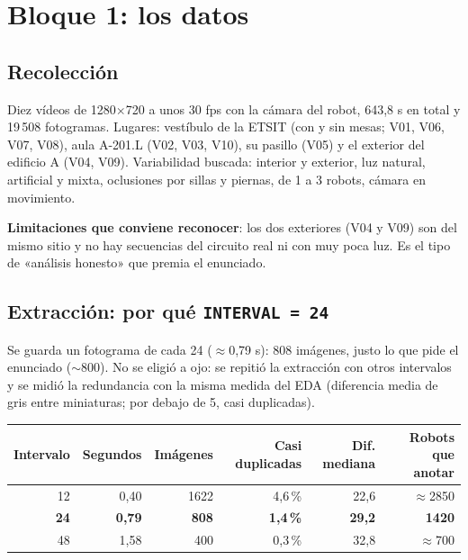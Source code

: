 \documentclass[11pt,a4paper]{article}
\begin{document}
\newpage
\section{Bloque 1: los datos}\label{sec:bloque1}

\subsection{Recolección}
Diez vídeos de 1280$\times$720 a unos 30 fps con la cámara del robot, 643,8 s en total y 19\,508 fotogramas. Lugares: vestíbulo de la ETSIT (con y sin mesas; V01, V06, V07, V08), aula A-201.L (V02, V03, V10), su pasillo (V05) y el exterior del edificio A (V04, V09). Variabilidad buscada: interior y exterior, luz natural, artificial y mixta, oclusiones por sillas y piernas, de 1 a 3 robots, cámara en movimiento.

\textbf{Limitaciones que conviene reconocer}: los dos exteriores (V04 y V09) son del mismo sitio y no hay secuencias del circuito real ni con muy poca luz. Es el tipo de «análisis honesto» que premia el enunciado.

\subsection{Extracción: por qué \texttt{INTERVAL = 24}}
Se guarda un fotograma de cada 24 ($\approx$0,79 s): 808 imágenes, justo lo que pide el enunciado ($\sim$800). No se eligió a ojo: se repitió la extracción con otros intervalos y se midió la redundancia con la misma medida del EDA (diferencia media de gris entre miniaturas; por debajo de 5, casi duplicadas).

\begin{center}
\small
\begin{tabular}{@{}rrrrrr@{}}
\toprule
\textbf{Intervalo} & \textbf{Segundos} & \textbf{Imágenes} & \textbf{Casi duplicadas} & \textbf{Dif. mediana} & \textbf{Robots que anotar} \\
\midrule
12 & 0,40 & 1622 & 4,6\,\% & 22,6 & $\approx$2850 \\
\textbf{24} & \textbf{0,79} & \textbf{808} & \textbf{1,4\,\%} & \textbf{29,2} & \textbf{1420} \\
48 & 1,58 & 400 & 0,3\,\% & 32,8 & $\approx$700 \\
\bottomrule
\end{tabular}
\end{center}
\end{document}
